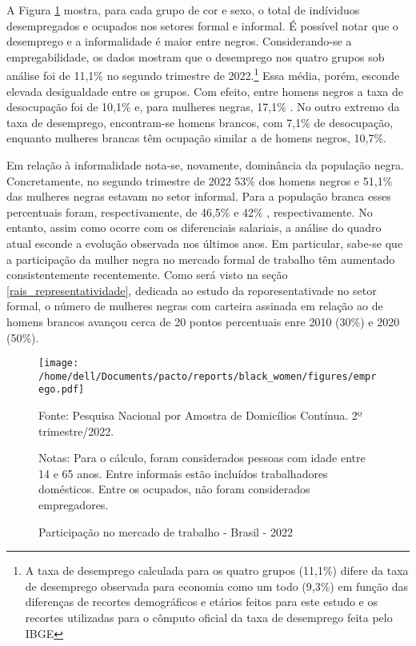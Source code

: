 \documentclass[12pt]{article}
\begin{document}
\par A Figura \ref{fig:employment} mostra, para cada grupo de cor e sexo, o total de indíviduos desempregados e ocupados nos setores formal e informal. É possível notar que o desemprego e a informalidade é maior entre negros. Considerando-se a empregabilidade, os dados mostram que o desemprego nos quatro grupos sob análise foi de 11,1\% no segundo trimestre de 2022.\footnote{A taxa de desemprego calculada para os quatro grupos (11,1\%) difere da taxa de desemprego observada para economia como um todo (9,3\%) em função das diferenças de recortes demográficos e etários feitos para este estudo e os recortes utilizadas para o cômputo oficial da taxa de desemprego feita pelo IBGE} Essa média, porém, esconde elevada desigualdade entre os grupos. Com efeito, entre homens negros a taxa de desocupação foi de 10,1\% e, para mulheres negras, 17,1\% . No outro extremo da taxa de desemprego, encontram-se homens brancos, com 7,1\% de desocupação, enquanto mulheres brancas têm ocupação similar a de homens negros, 10,7\%.

\par Em relação à informalidade nota-se, novamente, dominância da população negra. Concretamente, no segundo trimestre de 2022 53\% dos homens negros e 51,1\% das mulheres negras estavam no setor informal. Para a população branca esses percentuais foram, respectivamente, de 46,5\%  e 42\% , respectivamente. No entanto, assim como ocorre com os diferenciais salariais, a análise do quadro atual esconde a evolução observada nos últimos anos. Em particular, sabe-se que a participação da mulher negra no mercado formal de trabalho têm aumentado consistentemente recentemente. Como será visto na seção \ref{rais_representatividade}, dedicada ao estudo da reporesentativade no setor formal, o número de mulheres negras com carteira assinada em relação ao de homens brancos avançou cerca de 20 pontos percentuais enre 2010 (30\%) e 2020 (50\%).

\begin{figure}[H]
    \centering
    \caption{Participação no mercado de trabalho - Brasil - 2022}
        \texttt{[image: /home/dell/Documents/pacto/reports/black\_women/figures/emprego.pdf]}
    \label{fig:employment}
    \begin{floatnotes}
        \item[Fonte:] Pesquisa Nacional por Amostra de Domicílios Contínua. 2º trimestre/2022.
        \item[Notas:] Para o cálculo, foram considerados pessoas com idade entre 14 e 65 anos. Entre informais estão incluídos trabalhadores domésticos. Entre os ocupados, não foram considerados empregadores.
    \end{floatnotes}
\end{figure}
\end{document}
